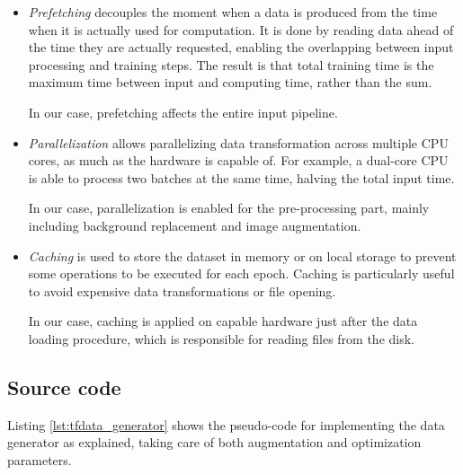 \begin{itemize}
    \item \textit{Prefetching} decouples the moment when a data is produced from the time when it is actually used for computation. It is done by reading data ahead of the time they are actually requested, enabling the overlapping between input processing and training steps. The result is that total training time is the maximum time between input and computing time, rather than the sum.
    
    In our case, prefetching affects the entire input pipeline.
    
    \item \textit{Parallelization} allows parallelizing data transformation across multiple CPU cores, as much as the hardware is capable of. For example, a dual-core CPU is able to process two batches at the same time, halving the total input time. 
    
    In our case, parallelization is enabled for the pre-processing part, mainly including background replacement and image augmentation.
    
    \item \textit{Caching} is used to store the dataset in memory or on local storage to prevent some operations to be executed for each epoch. Caching is particularly useful to avoid expensive data transformations or file opening.
    
    In our case, caching is applied on capable hardware just after the data loading procedure, which is responsible for reading files from the disk.
\end{itemize}



\subsection{Source code}
\label{subsec:data-generator-code}

Listing \ref{lst:tfdata_generator} shows the pseudo-code for implementing the data generator as explained, taking care of both augmentation and optimization parameters.

